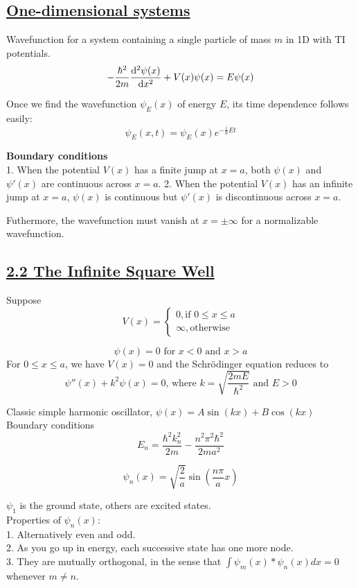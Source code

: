 \subsection{\underline{One-dimensional systems}}
Wavefunction for a system containing a single particle of mass $m$ in 1D with TI potentials.
    $$- \frac{\hbar^2}{2m} \dv[2]{\psi(x)}{x} + V(x) \psi(x) = E \psi(x)$$

Once we find the wavefunction $\psi_E(x)$ of energy $E$, its time dependence follows easily:
    $$\psi_E(x, t) = \psi_E(x) e^{-\frac{i}{\hbar} E t}$$

\textbf{Boundary conditions} \\
1. When the potential $V(x)$ has a finite jump at $x = a$, both $\psi(x)$ and $\psi'(x)$ are continuous across $x = a$.
2. When the potential $V(x)$ has an infinite jump at $x = a$, $\psi(x)$ is continuous but $\psi'(x)$ is discontinuous across $x = a$.

Futhermore, the wavefunction must vanish at $x = \pm \infty$ for a normalizable wavefunction.

\subsection{\underline{2.2 The Infinite Square Well}}
Suppose
    $$V(x) = \begin{cases} 0, \textrm{if } 0 \leq x \leq a \\ \infty, \textrm{otherwise} \end{cases}$$

    $$\psi(x) = 0 \textrm{ for } x < 0 \textrm{ and } x > a$$
For $0 \leq x \leq a$, we have $V(x) = 0$ and the Schr\"odinger equation reduces to 
    $$\psi''(x) + k^2 \psi(x) = 0 \textrm{, where } k = \sqrt{\frac{2mE}{\hbar^2}} \textrm{ and } E > 0$$

Classic simple harmonic oscillator, $\psi(x) = A \sin(kx) + B \cos(kx)$ \\

Boundary conditions \\

$$E_n = \frac{\hbar^2 k_n^2}{2m} - \frac{n^2 \pi^2 \hbar^2}{2ma^2}$$

$$\psi_n(x) = \sqrt{\frac{2}{a}} \sin(\frac{n \pi}{a} x)$$

$\psi_1$ is the ground state, others are excited states. \\

Properties of $\psi_n(x)$: \\
1. Alternatively even and odd. \\
2. As you go up in energy, each successive state has one more node. \\
3. They are mutually orthogonal, in the sense that $\int \psi_m(x)* \psi_n(x) dx = 0$ whenever $m \neq n$. \\

